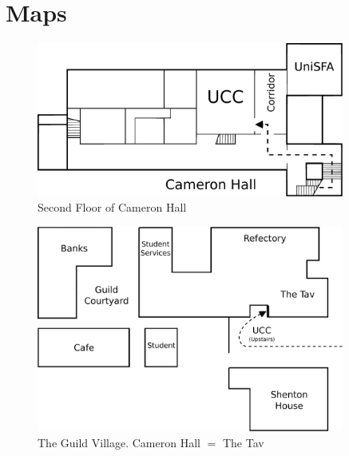 \label{FindClubroom}



\section{Maps}

\begin{figure}[H]
	\centering
	\includegraphics[width=0.9\textwidth]{figures/CamHallMap.eps}
	\caption{Second Floor of Cameron Hall}
	\label{CamHallMap.eps}
\end{figure}

\begin{figure}[H]
	\centering
	\includegraphics[width=0.9\textwidth]{figures/OutsideMap.eps}
	\caption{The Guild Village. Cameron Hall $=$ The Tav}
	\label{OutsideMap.eps}
\end{figure}

